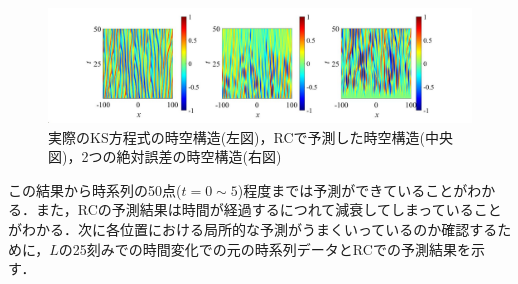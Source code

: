 \documentclass[autodetect-engine,dvipdfmx-if-dvi,ja=standard,a4paper,11pt]{bxjsarticle} %
\begin{document}
\begin{figure}[H]%
\begin{center}
\includegraphics[width=.9\textwidth]{KS_error2.jpg} 
\end{center}
\caption{実際のKS方程式の時空構造(左図)，RCで予測した時空構造(中央図)，2つの絶対誤差の時空構造(右図)}%
\label{fig:KSRC}%
\end{figure}
この結果から時系列の50点($t=0\sim5$)程度までは予測ができていることがわかる．また，RCの予測結果は時間が経過するにつれて減衰してしまっていることがわかる．次に各位置における局所的な予測がうまくいっているのか確認するために，$L$の25刻みでの時間変化での元の時系列データとRCでの予測結果を示す．
\end{document}
